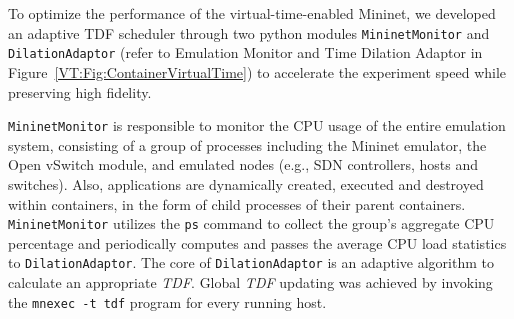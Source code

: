 To optimize the performance of the virtual-time-enabled Mininet, we developed an adaptive TDF scheduler
through two python modules \texttt{MininetMonitor} and \texttt{DilationAdaptor}
(refer to Emulation Monitor and Time Dilation Adaptor in Figure~\ref{VT:Fig:ContainerVirtualTime})
to accelerate the experiment speed while preserving high fidelity.

\texttt{MininetMonitor} is responsible to monitor the CPU usage of the entire emulation system,
consisting of a group of processes including the Mininet emulator, the Open vSwitch module, and emulated nodes (e.g., SDN controllers, hosts and switches). 
Also, applications are dynamically created, executed and destroyed within containers, in the form of child processes of their parent containers. 
\texttt{MininetMonitor} utilizes the \texttt{ps} command to collect the group's aggregate CPU percentage
and periodically computes and passes the average CPU load statistics to \texttt{DilationAdaptor}. 
The core of \texttt{DilationAdaptor} is an adaptive algorithm to calculate an appropriate \textit{TDF}.
Global \textit{TDF} updating was achieved by invoking the \texttt{mnexec\ -t\ tdf} program for every running host. 




